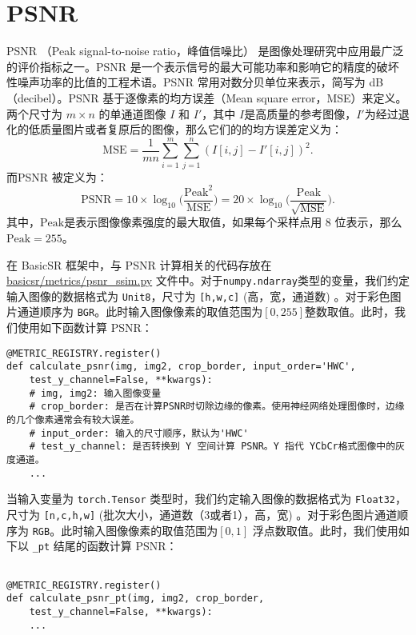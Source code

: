 \documentclass[../main.tex]{subfiles}
\begin{document}
\section{PSNR}
PSNR （Peak signal-to-noise ratio，峰值信噪比） 是图像处理研究中应用最广泛的评价指标之一。PSNR 是一个表示信号的最大可能功率和影响它的精度的破坏性噪声功率的比值的工程术语。PSNR 常用对数分贝单位来表示，简写为 dB（decibel）。PSNR 基于逐像素的均方误差（Mean square error，MSE）来定义。两个尺寸为 $m\times n$ 的单通道图像 $I$ 和 $I'$，其中 $I$是高质量的参考图像，$I'$为经过退化的低质量图片或者复原后的图像，那么它们的的均方误差定义为：
$$
\mathrm{MSE}=\frac{1}{mn}\sum_{i=1}^{m}\sum_{j=1}^n(I[i,j]-I'[i,j])^2.
$$
而PSNR 被定义为：
$$
\mathrm{PSNR}=10\times \log_{10}\Big(\frac{\mathrm{Peak}^2}{\mathrm{MSE}}\Big)=20\times\log_{10}\Big(\frac{\mathrm{Peak}}{\sqrt{\mathrm{MSE}}}\Big).
$$
其中，$\mathrm{Peak}$是表示图像像素强度的最大取值，如果每个采样点用 8 位表示，那么$\mathrm{Peak}=255$。

在 BasicSR 框架中，与 PSNR 计算相关的代码存放在 \href{https://github.com/XPixelGroup/BasicSR/blob/master/basicsr/metrics/psnr_ssim.py#L12}{basicsr/metrics/psnr\_ssim.py} 文件中。对于\texttt{numpy.ndarray}类型的变量，我们约定输入图像的数据格式为 \texttt{Unit8}，尺寸为 \texttt{[h,w,c]} (高，宽，通道数) 。对于彩色图片通道顺序为 \texttt{BGR}。此时输入图像像素的取值范围为$[0,255]$整数取值。此时，我们使用如下函数计算 PSNR：

\begin{verbatim}
@METRIC_REGISTRY.register()
def calculate_psnr(img, img2, crop_border, input_order='HWC',
    test_y_channel=False, **kwargs):
    # img, img2: 输入图像变量
    # crop_border: 是否在计算PSNR时切除边缘的像素。使用神经网络处理图像时，边缘的几个像素通常会有较大误差。
    # input_order: 输入的尺寸顺序，默认为'HWC'
    # test_y_channel: 是否转换到 Y 空间计算 PSNR。Y 指代 YCbCr格式图像中的灰度通道。
    ...
\end{verbatim}

当输入变量为 \texttt{torch.Tensor} 类型时，我们约定输入图像的数据格式为 \texttt{Float32}，尺寸为 \texttt{[n,c,h,w]} (批次大小，通道数（3或者1），高，宽) 。对于彩色图片通道顺序为 \texttt{RGB}。此时输入图像像素的取值范围为$ [0,1]$ 浮点数取值。此时，我们使用如下以 \texttt{\_pt} 结尾的函数计算 PSNR：

\begin{verbatim}

@METRIC_REGISTRY.register()
def calculate_psnr_pt(img, img2, crop_border,
    test_y_channel=False, **kwargs):
    ...
\end{verbatim}
\end{document}

